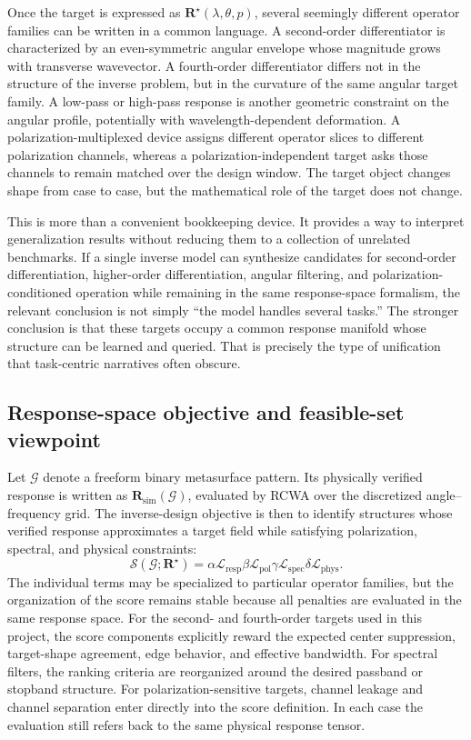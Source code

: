 Once the target is expressed as $\mathbf{R}^{\star}(\lambda,\theta,p)$, several seemingly different operator families can be written in a common language. A second-order differentiator is characterized by an even-symmetric angular envelope whose magnitude grows with transverse wavevector. A fourth-order differentiator differs not in the structure of the inverse problem, but in the curvature of the same angular target family. A low-pass or high-pass response is another geometric constraint on the angular profile, potentially with wavelength-dependent deformation. A polarization-multiplexed device assigns different operator slices to different polarization channels, whereas a polarization-independent target asks those channels to remain matched over the design window. The target object changes shape from case to case, but the mathematical role of the target does not change.

This is more than a convenient bookkeeping device. It provides a way to interpret generalization results without reducing them to a collection of unrelated benchmarks. If a single inverse model can synthesize candidates for second-order differentiation, higher-order differentiation, angular filtering, and polarization-conditioned operation while remaining in the same response-space formalism, the relevant conclusion is not simply ``the model handles several tasks.'' The stronger conclusion is that these targets occupy a common response manifold whose structure can be learned and queried. That is precisely the type of unification that task-centric narratives often obscure.

\subsection{Response-space objective and feasible-set viewpoint}

Let $\mathcal{G}$ denote a freeform binary metasurface pattern. Its physically verified response is written as $\mathbf{R}_{\mathrm{sim}}(\mathcal{G})$, evaluated by RCWA over the discretized angle--frequency grid. The inverse-design objective is then to identify structures whose verified response approximates a target field while satisfying polarization, spectral, and physical constraints:
\[
\mathcal{S}(\mathcal{G};\mathbf{R}^{\star})=
\alpha \mathcal{L}_{\mathrm{resp}}
\beta \mathcal{L}_{\mathrm{pol}}
\gamma \mathcal{L}_{\mathrm{spec}}
\delta \mathcal{L}_{\mathrm{phys}}.
\]
The individual terms may be specialized to particular operator families, but the organization of the score remains stable because all penalties are evaluated in the same response space. For the second- and fourth-order targets used in this project, the score components explicitly reward the expected center suppression, target-shape agreement, edge behavior, and effective bandwidth. For spectral filters, the ranking criteria are reorganized around the desired passband or stopband structure. For polarization-sensitive targets, channel leakage and channel separation enter directly into the score definition. In each case the evaluation still refers back to the same physical response tensor.

